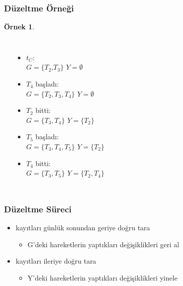 \documentclass[dvipsnames]{beamer}
\theoremstyle{definition}
\theoremstyle{example}
\newtheorem{ornek}[theorem]{Örnek}
\theoremstyle{plain}
\begin{document}
\begin{frame}
  \frametitle{Düzeltme Örneği}

  \begin{ornek}
    \begin{columns}[t]
      \begin{center}
      \end{center}

      \pause
      \begin{itemize}
        \item $t_C$:\\
          $G=\{T_2$,$T_3\}$
          $Y=\emptyset$

        \pause
        \item $T_4$ başladı:\\
          $G=\{T_2,T_3,T_4\}$
          $Y=\emptyset$

        \pause
        \item $T_2$ bitti:\\
          $G=\{T_3,T_4\}$
          $Y=\{T_2\}$

        \pause
        \item $T_5$ başladı:\\
          $G=\{T_3,T_4,T_5\}$
          $Y=\{T_2\}$

        \pause
        \item $T_4$ bitti:\\
          $G=\{T_3,T_5\}$
          $Y=\{T_2,T_4\}$
      \end{itemize}
    \end{columns}
  \end{ornek}
\end{frame}

\begin{frame}
  \frametitle{Düzeltme Süreci}

  \begin{itemize}
    \item kayıtları günlük sonundan geriye doğru tara
    \begin{itemize}
      \item G'deki hareketlerin yaptıkları değişiklikleri geri al
    \end{itemize}

    \pause
    \item kayıtları ileriye doğru tara
    \begin{itemize}
      \item Y'deki hareketlerin yaptıkları değişiklikleri yinele
    \end{itemize}
  \end{itemize}
\end{frame}
\end{document}
